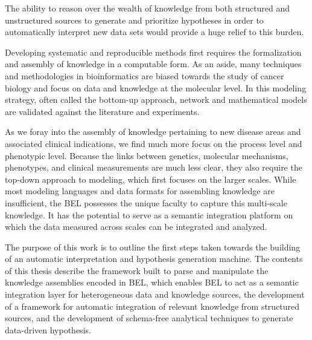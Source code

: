 \documentclass[twoside, 12pt,  footinclude=true,  headinclude=true,  cleardoublepage=empty]{scrbook}
\begin{document}
The ability to reason over the wealth of knowledge from both structured and unstructured sources to generate and prioritize hypotheses in order to automatically interpret new data sets would provide a huge relief to this burden. 

Developing systematic and reproducible methods first requires the formalization and assembly of knowledge in a computable form. As an aside, many techniques and methodologies in bioinformatics are biased towards the study of cancer biology and focus on data and knowledge at the molecular level. In this modeling strategy, often called the bottom-up approach, network and mathematical models are validated against the literature and experiments. 

As we foray into the assembly of knowledge pertaining to new disease areas and associated clinical indications, we find much more focus on the process level and phenotypic level. Because the links between genetics, molecular mechanisms, phenotypes, and clinical measurements are much less clear, they also require the top-down approach to modeling, which first focuses on the larger scales.  While most modeling languages and data formats for assembling knowledge are insufficient, the \ac{BEL} possesses the unique faculty to capture this multi-scale knowledge. It has the potential to serve as a semantic integration platform on which the data measured across scales can be integrated and analyzed. 

The purpose of this work is to outline the first steps taken towards the building of an automatic interpretation and hypothesis generation machine. The contents of this thesis describe the framework built to parse and manipulate the knowledge assemblies encoded in \ac{BEL}, which enables \ac{BEL} to act as a semantic integration layer for heterogeneous data and knowledge sources, the development of a framework for automatic integration of relevant knowledge from structured sources, and the development of schema-free analytical techniques to generate data-driven hypothesis.

\mainmatter





% 

% 

% 


\end{document}
